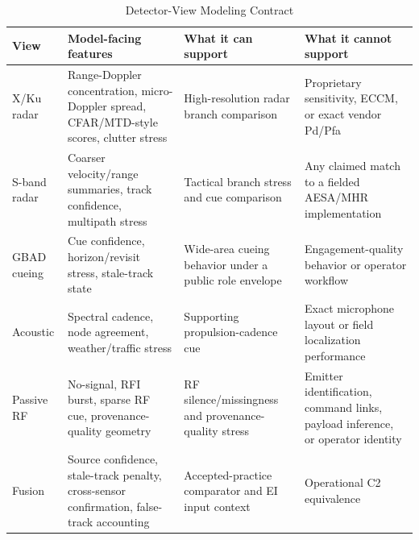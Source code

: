 \begin{table}[t]
  \caption{Detector-View Modeling Contract}
  \label{tab:detectorviewcontract}
  \centering
  \small
  \begin{tabular}{@{}p{}p{}p{}p{}@{}}
    \toprule
    View & Model-facing features & What it can support & What it cannot support \\
    \midrule
    X/Ku radar & Range-Doppler concentration, micro-Doppler spread, CFAR/MTD-style scores, clutter stress & High-resolution radar branch comparison & Proprietary sensitivity, ECCM, or exact vendor Pd/Pfa \\
    S-band radar & Coarser velocity/range summaries, track confidence, multipath stress & Tactical branch stress and cue comparison & Any claimed match to a fielded AESA/MHR implementation \\
    GBAD cueing & Cue confidence, horizon/revisit stress, stale-track state & Wide-area cueing behavior under a public role envelope & Engagement-quality behavior or operator workflow \\
    Acoustic & Spectral cadence, node agreement, weather/traffic stress & Supporting propulsion-cadence cue & Exact microphone layout or field localization performance \\
    Passive RF & No-signal, RFI burst, sparse RF cue, provenance-quality geometry & RF silence/missingness and provenance-quality stress & Emitter identification, command links, payload inference, or operator identity \\
    Fusion & Source confidence, stale-track penalty, cross-sensor confirmation, false-track accounting & Accepted-practice comparator and EI input context & Operational C2 equivalence \\
    \bottomrule
  \end{tabular}
\end{table}

